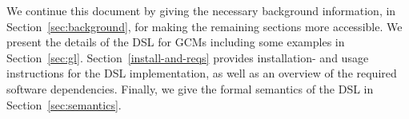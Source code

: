 
We continue this document by giving the necessary background information, in
Section~\ref{sec:background}, for making the remaining sections more accessible.
We present the details of the \ac{DSL} for \acp{GCM} including some examples in
Section~\ref{sec:gl}. Section~\ref{install-and-reqs} provides installation- and
usage instructions for the \ac{DSL} implementation, as well as an overview of
the required software dependencies. Finally, we give the formal semantics of
the \ac{DSL} in Section~\ref{sec:semantics}.

